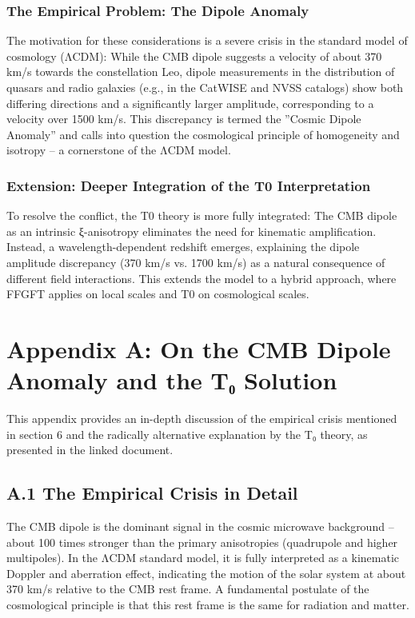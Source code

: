 \documentclass[12pt,a4paper]{article}
\begin{document}
	\subsubsection*{The Empirical Problem: The Dipole Anomaly}
	
	The motivation for these considerations is a severe crisis in the standard model of cosmology (ΛCDM): While the CMB dipole suggests a velocity of about 370 km/s towards the constellation Leo, dipole measurements in the distribution of quasars and radio galaxies (e.g., in the CatWISE and NVSS catalogs) show both differing directions and a significantly larger amplitude, corresponding to a velocity over 1500 km/s. This discrepancy is termed the ''Cosmic Dipole Anomaly'' and calls into question the cosmological principle of homogeneity and isotropy – a cornerstone of the ΛCDM model.
	
	\subsubsection*{Extension: Deeper Integration of the T0 Interpretation}
	To resolve the conflict, the T0 theory is more fully integrated: The CMB dipole as an intrinsic ξ-anisotropy eliminates the need for kinematic amplification. Instead, a wavelength-dependent redshift emerges, explaining the dipole amplitude discrepancy (370 km/s vs. 1700 km/s) as a natural consequence of different field interactions. This extends the model to a hybrid approach, where FFGFT applies on local scales and T0 on cosmological scales.
	
	\section*{Appendix A: On the CMB Dipole Anomaly and the T₀ Solution}
	
	This appendix provides an in-depth discussion of the empirical crisis mentioned in section 6 and the radically alternative explanation by the T₀ theory, as presented in the linked document.
	
	\subsection*{A.1 The Empirical Crisis in Detail}
	
	The CMB dipole is the dominant signal in the cosmic microwave background – about 100 times stronger than the primary anisotropies (quadrupole and higher multipoles). In the ΛCDM standard model, it is fully interpreted as a kinematic Doppler and aberration effect, indicating the motion of the solar system at about 370 km/s relative to the CMB rest frame. A fundamental postulate of the cosmological principle is that this rest frame is the same for radiation and matter.
	
\end{document}
